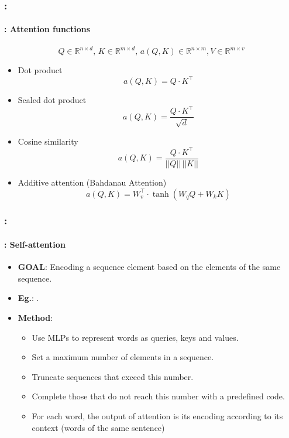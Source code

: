 \documentclass[xcolor=table]{beamer}
\begin{document}
\begin{frame}
	\frametitle{\insertshortsubtitle: \insertsection}
	\framesubtitle{\insertsubsection: Attention functions}
	
		\[Q \in \mathbb{R}^{n \times d}, \, K \in \mathbb{R}^{m \times d}, \, a(Q, K) \in \mathbb{R}^{n \times m}, V \in \mathbb{R}^{m \times v} \]
	
	\begin{itemize}

	\item Dot product
	\[a(Q, K) = Q \cdot K^\top \]
	
	\item Scaled dot product 
	\[a(Q, K) = \frac{Q \cdot K^\top}{\sqrt{d}}\]
	
	\item Cosine similarity
	\[a(Q, K) = \frac{Q \cdot K^\top}{||Q|| \, ||K||}\]
	
	\item Additive attention (Bahdanau Attention)
	\[a(Q, K) = W_v^\top \cdot \tanh(W_q Q + W_k K)\]
\end{itemize}
	
\end{frame}

\begin{frame}
	\frametitle{\insertshortsubtitle: \insertsection}
	\framesubtitle{\insertsubsection: Self-attention}
	
	\begin{itemize}
		\item \textbf{GOAL}: Encoding a sequence element based on the elements of the same sequence.
		\item \textbf{Eg.}: .
		\item \textbf{Method}:
		\begin{itemize}
			\item Use MLPs to represent words as queries, keys and values.
			\item Set a maximum number of elements in a sequence.
			\item Truncate sequences that exceed this number.
			\item Complete those that do not reach this number with a predefined code.
			\item For each word, the output of attention is its encoding according to its context (words of the same sentence)
		\end{itemize}
	\end{itemize}

\end{frame}
\end{document}
